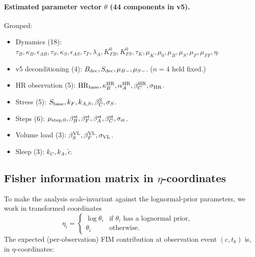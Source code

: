 \paragraph{Estimated parameter vector $\theta$ (44 components in v5).} Grouped:
\begin{itemize}
  \item Dynamics (18): $\tau_B, \kappa_B, \epsilon_{AB}, \tau_S, \kappa_S, \epsilon_{AS}, \tau_F, \lambda_A, K_{FB}^0, K_{FS}^0, \tau_K, \mu_K, \mu_0, \mu_B, \mu_S, \mu_F, \mu_{FF}, \eta$.
  \item v5 deconditioning (4): $B_{\rm dec}, S_{\rm dec}, \mu_{B-}, \mu_{S-}$. ($n=4$ held fixed.)
  \item HR observation (5): ${\rm HR}_{\rm base}, \kappa_B^{\rm HR}, \alpha_A^{\rm HR}, \beta_C^{\rm HR}, \sigma_{\rm HR}$.
  \item Stress (5): $S_{\rm base}, k_F, k_{A,S}, \beta_C^{\rm S}, \sigma_S$.
  \item Steps (6): $\mu_{\rm step,0}, \beta_B^{\rm st}, \beta_F^{\rm st}, \beta_A^{\rm st}, \beta_C^{\rm st}, \sigma_{\rm st}$.
  \item Volume load (3): $\beta_S^{\rm VL}, \beta_F^{\rm VL}, \sigma_{\rm VL}$.
  \item Sleep (3): $k_C, k_A, \tilde c$.
\end{itemize}

\subsection{Fisher information matrix in $\eta$-coordinates} \label{sec:fim-defn}

To make the analysis scale-invariant against the lognormal-prior parameters, we work in transformed coordinates
\begin{equation}
\eta_i = \begin{cases}\log \theta_i & \text{if $\theta_i$ has a lognormal prior},\\ \theta_i & \text{otherwise}.\end{cases}
\end{equation}
The expected (per-observation) FIM contribution at observation event $(c, t_k)$ is, in $\eta$-coordinates:

